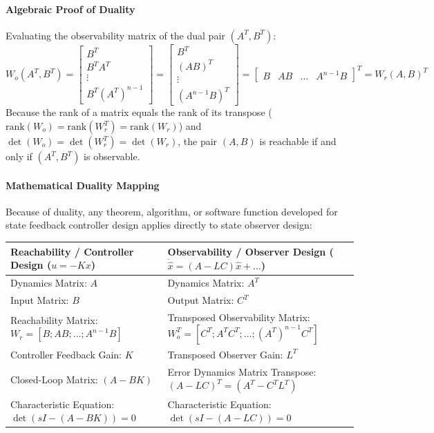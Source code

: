 \documentclass[12pt,onecolumn,twoside ]{article}
\begin{document}
	\paragraph{Algebraic Proof of Duality}
	Evaluating the observability matrix of the dual pair $(A^T, B^T)$: \[
	W_o(A^T, B^T) = \begin{bmatrix} B^T \\ B^T A^T \\ \vdots \\ B^T (A^T)^{n-1} \end{bmatrix} = \begin{bmatrix} B^T \\ (AB)^T \\ \vdots \\ (A^{n-1}B)^T \end{bmatrix} = \begin{bmatrix} B & AB & \dots & A^{n-1}B \end{bmatrix}^T = W_r(A, B)^T
	\]
	Because the rank of a matrix equals the rank of its transpose ($\text{rank}(W_o) = \text{rank}(W_r^T) = \text{rank}(W_r)$) and $\det(W_o) = \det(W_r^T) = \det(W_r)$, the pair $(A, B)$ is reachable if and only if $(A^T, B^T)$ is observable.
	\paragraph{Mathematical Duality Mapping}
	Because of duality, any theorem, algorithm, or software function developed for state feedback controller design applies directly to state observer design:
	\begin{center}\small\begin{tabularx}{\textwidth}{*{2}{Y}}
			\toprule
			\textbf{Reachability / Controller Design ($u = -Kx$)} & \textbf{Observability / Observer Design ($\dot{\hat{x}} = (A-LC)\hat{x} + \dots$)} \\
			\midrule
			Dynamics Matrix: $A$ & Dynamics Matrix: $A^T$ \\
			Input Matrix: $B$ & Output Matrix: $C^T$ \\
			Reachability Matrix: $W_r = [B ; AB ; \dots ; A^{n-1}B]$ & Transposed Observability Matrix: $W_o^T = [C^T ; A^TC^T ; \dots ; (A^T)^{n-1}C^T]$ \\
			Controller Feedback Gain: $K$ & Transposed Observer Gain: $L^T$ \\
			Closed-Loop Matrix: $(A - BK)$ & Error Dynamics Matrix Transpose: $(A - LC)^T = (A^T - C^T L^T)$ \\
			Characteristic Equation: $\det(sI - (A - BK)) = 0$ & Characteristic Equation: $\det(sI - (A - LC)) = 0$ \\
			\bottomrule
	\end{tabularx}\end{center}
\end{document}
